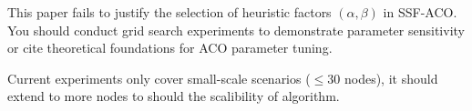 \reviewer

\begin{revcomment}
	This paper fails to justify the selection of heuristic factors $(\alpha, \beta)$ in SSF-ACO. You should conduct grid search experiments to demonstrate parameter sensitivity or cite theoretical foundations for ACO parameter tuning.
\end{revcomment}
\begin{revresponse}

\end{revresponse}

\begin{revcomment}
	Current experiments only cover small-scale scenarios ($\leq 30$ nodes), it should extend to more nodes to should the scalibility of algorithm.
\end{revcomment}
\begin{revresponse}
	
\end{revresponse}

